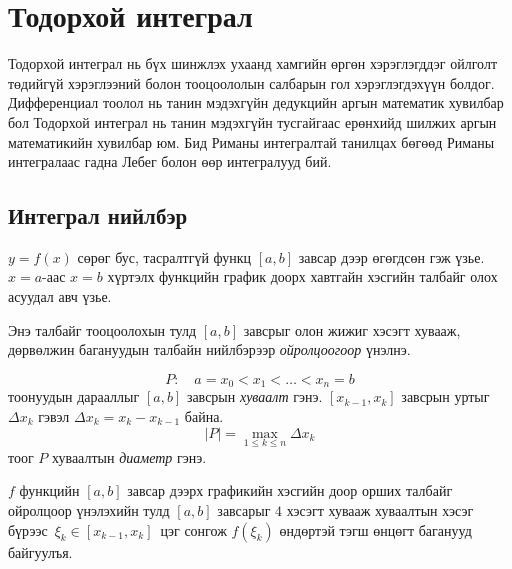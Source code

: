 \chapter{Тодорхой интеграл}
Тодорхой интеграл нь бүх шинжлэх ухаанд хамгийн өргөн хэрэглэгддэг 
ойлголт төдийгүй хэрэглээний болон тооцоололын салбарын гол хэрэглэгдэхүүн болдог. Дифференциал тоолол нь танин мэдэхгүйн дедукцийн аргын математик хувилбар бол Тодорхой интеграл нь танин мэдэхгүйн тусгайгаас ерөнхийд шилжих аргын математикийн хувилбар юм. Бид Риманы интегралтай танилцах бөгөөд Риманы интегралаас гадна Лебег болон өөр интегралууд бий.

\section{ Интеграл нийлбэр}
$y=f(x)$ сөрөг бус, тасралтгүй функц $[a,b]$ завсар дээр өгөгдсөн гэж үзье.  $x=a$-аас $x=b$ хүртэлх функцийн график доорх хавтгайн хэсгийн талбайг олох асуудал авч үзье.

\begin{center}
\end{center}
Энэ талбайг тооцоолохын тулд $[a,b]$ завсрыг олон жижиг хэсэгт хувааж,
дөрвөлжин багануудын талбайн нийлбэрээр \emph{ойролцоогоор} үнэлнэ.
\begin{definition}[Хуваалт]
\[
P:\quad a = x_0 < x_1 < \dots < x_n = b
\]
тоонуудын дарааллыг $[a,b]$ завсрын \emph{хуваалт} гэнэ. $[x_{k-1},x_k]$ завсрын уртыг $\Delta x_k$ гэвэл $\Delta x_k = x_k - x_{k-1}$ байна. 
\[
|P| = \max_{1\le k\le n} \Delta x_k
\] тоог $P$ хуваалтын \emph{диаметр} гэнэ.
\end{definition}

 $f$ функцийн $[a,b]$ завсар дээрх графикийн хэсгийн доор орших талбайг ойролцоор үнэлэхийн тулд $[a,b]$ завсарыг $4$ хэсэгт хувааж хуваалтын хэсэг бүрээс $\,\xi_k \in [x_{k-1},x_k]\,$ цэг сонгож $f(\xi_k)$ өндөртэй тэгш өнцөгт баганууд байгуулъя.

